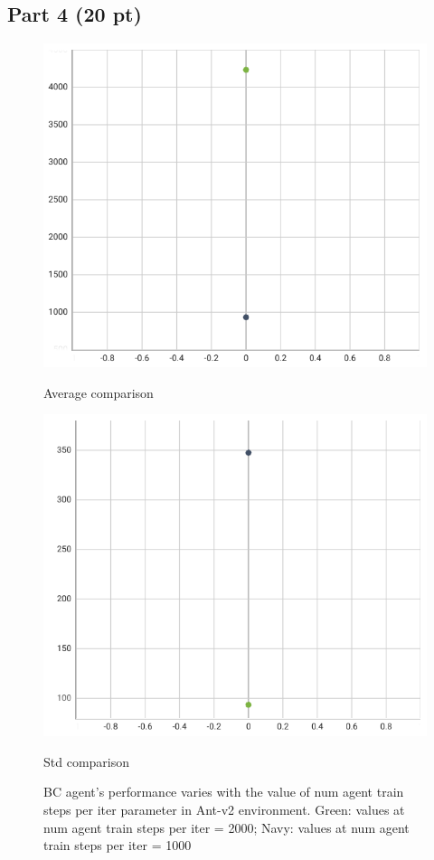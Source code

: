 \documentclass{article}
\begin{document}
\subsection{Part 4 (20 pt)}

\begin{figure}[!h]
        \centering
        \begin{minipage}[b]{0.45\textwidth}
            \centering
            \includegraphics[width=0.9\linewidth]{hw1/ant_avg_comp.png}
            \caption{Average comparison}
            \label{fig:sub1}
        \end{minipage}
        \hfill
        \begin{minipage}[b]{0.45\textwidth}
            \centering
            \includegraphics[width=0.9\linewidth]{hw1/ant_std_comp.png}
            \caption{Std comparison}
            \label{fig:sub2}
        \end{minipage}
	\caption{BC agent’s performance varies with the value of num agent train steps per iter parameter in Ant-v2 environment. Green: values at num agent train steps per iter = 2000; Navy: values at num agent train steps per iter = 1000}
\end{figure}
\end{document}
